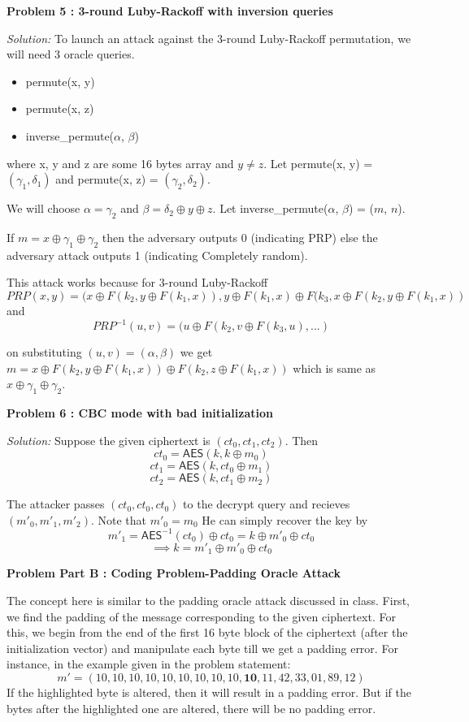 \documentclass[a4paper, 11pt]{article}
\newenvironment{solution}
    {\textit{Solution:}}
    {\clearpage}
\newcommand{\prob}[1]{\begin{mdframed}[backgroundcolor=gray!20] \textbf{Problem #1}\end{mdframed}}
\newcommand{\AES}{\mathsf{AES}}
\begin{document}
\prob{5 : 3-round Luby-Rackoff with inversion queries}
\begin{solution}
    To launch an attack against the 3-round Luby-Rackoff permutation, we will need 3 oracle queries.
    \begin{itemize}
        \item permute(x, y)
        \item permute(x, z)
        \item inverse\_permute($\alpha$, $\beta$)
    \end{itemize}
    where x, y and z are some 16 bytes array and $y \neq z$. Let permute(x, y) = $(\gamma_1, \delta_1)$ and permute(x, z) = $(\gamma_2, \delta_2)$.

    We will choose $\alpha = \gamma_2$ and $\beta = \delta_2 \oplus y \oplus z$. Let inverse\_permute($\alpha$, $\beta$) = ($m$, $n$).

    If $ m = x \oplus \gamma_1 \oplus \gamma_2$ then the adversary outputs 0 (indicating PRP) else the adversary attack outputs 1 (indicating Completely random).

    This attack works because for 3-round Luby-Rackoff $$PRP(x, y) = (x \oplus F(k_2, y \oplus F(k_1, x)), y \oplus F(k_1, x) \oplus F(k_3, x \oplus F(k_2, y \oplus F(k_1, x))$$
    and
    $$PRP^{-1}(u, v) = (u \oplus F(k_2, v \oplus F(k_3, u), ... )$$

    on substituting $(u, v) = (\alpha, \beta)$ we get $m = x \oplus F(k_2, y \oplus F(k_1, x)) \oplus F(k_2, z \oplus F(k_1, x))$ which is same as $x \oplus \gamma_1 \oplus \gamma_2$.
\end{solution}


\prob{6 : CBC mode with bad initialization}
\begin{solution}
    Suppose the given ciphertext is $(ct_0, ct_1, ct_2)$. Then
    $$ct_0=\AES(k,k\oplus m_0)$$
    $$ct_1=\AES(k,ct_0\oplus m_1)$$
    $$ct_2=\AES(k,ct_1\oplus m_2)$$

    The attacker passes $(ct_0, ct_0, ct_0)$ to the decrypt query and recieves $(m'_0,m'_1,m'_2)$. Note that $m'_0=m_0$ He can simply recover the key by
    $$m'_1=\AES^{-1}(ct_0)\oplus ct_0=k\oplus m'_0\oplus ct_0$$
    $$\implies k=m'_1\oplus m'_0\oplus ct_0$$
\end{solution}


\prob{Part B : Coding Problem-Padding Oracle Attack}
The concept here is similar to the padding oracle attack discussed in class. First, we find the padding of the message corresponding to the given ciphertext. For this, we begin from the end of the first 16 byte block of the ciphertext (after the initialization vector) and manipulate each byte till we get a padding error. For instance, in the example given in the problem statement:
$$m' = (10, 10, 10, 10, 10, 10, 10, 10, 10, \mathbf{10}, 11, 42, 33, 01, 89, 12)$$
If the highlighted byte is altered, then it will result in a padding error. But if the bytes after the highlighted one are altered, there will be no padding error.
\end{document}
